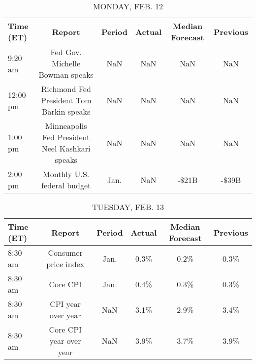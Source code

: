 \documentclass{article}%
\begin{document}
%
\normalsize%


\begin{table}[htbp]%
\caption{MONDAY, FEB. 12}%
\centering%
\begin{adjustbox}{width=1\textwidth}%
\begin{tabular}{lccccc}
\toprule
Time (ET) &                                         Report & Period & Actual & Median Forecast & Previous \\
\midrule
  9:20 am &                Fed Gov. Michelle Bowman speaks &    NaN &    NaN &             NaN &      NaN \\
 12:00 pm &       Richmond Fed President Tom Barkin speaks &    NaN &    NaN &             NaN &      NaN \\
  1:00 pm & Minneapolis Fed President Neel Kashkari speaks &    NaN &    NaN &             NaN &      NaN \\
  2:00 pm &                    Monthly U.S. federal budget &   Jan. &    NaN &           -\$21B &    -\$39B \\
\bottomrule
\end{tabular}
%
\end{adjustbox}%
\end{table}

%


\begin{table}[htbp]%
\caption{TUESDAY, FEB. 13}%
\centering%
\begin{adjustbox}{width=1\textwidth}%
\begin{tabular}{lccccc}
\toprule
Time (ET) &                  Report & Period & Actual & Median Forecast & Previous \\
\midrule
  8:30 am &    Consumer price index &   Jan. &   0.3\% &            0.2\% &     0.3\% \\
  8:30 am &                Core CPI &   Jan. &   0.4\% &            0.3\% &     0.3\% \\
  8:30 am &      CPI year over year &    NaN &   3.1\% &            2.9\% &     3.4\% \\
  8:30 am & Core CPI year over year &    NaN &   3.9\% &            3.7\% &     3.9\% \\
\bottomrule
\end{tabular}
%
\end{adjustbox}%
\end{table}

%
\end{document}
